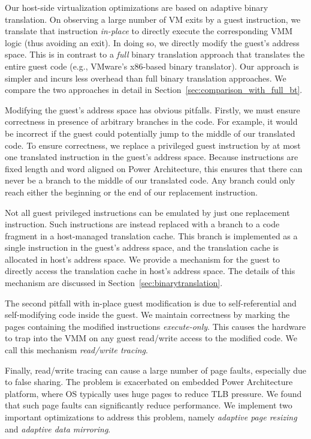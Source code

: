 \documentclass[10pt,twocolumn]{article}
\begin{document}
Our host-side virtualization optimizations are based on adaptive binary
translation. On observing a large number of VM exits by a guest instruction, we translate
that instruction {\em in-place} to directly execute the corresponding
VMM logic (thus avoiding an exit). In doing so, we directly modify the guest's
address space. This is in contrast to a {\em full} binary translation approach
that translates the entire guest code
(e.g., VMware's x86-based binary translator\cite{adams:asplos06}). Our approach is
simpler and incurs less overhead than full binary
translation approaches. We compare the two approaches in detail in
Section~\ref{sec:comparison_with_full_bt}.

Modifying the guest's address space has obvious pitfalls.
Firstly, we must ensure correctness in presence
of arbitrary branches in the code. For example, it would be incorrect if the guest
could potentially jump to the middle of our translated code.
To ensure correctness, we replace a privileged guest instruction
by at most one translated instruction in the guest's address space. Because instructions
are fixed length and word aligned on Power Architecture, this ensures that
there can never be a branch to the middle of our translated
code. Any branch could only reach either the beginning or the end of our
replacement instruction.

Not all guest privileged instructions can be emulated by just one
replacement instruction.
Such instructions are instead replaced with a branch to a code
fragment in a host-managed translation cache. This branch is implemented as a
single instruction in the guest's address space, and the translation
cache is allocated in host's address space. We provide a mechanism for the guest
to directly access the translation cache in host's address space. The
details of this mechanism are discussed in Section~\ref{sec:binarytranslation}.

The second pitfall with in-place guest modification is due to
self-referential and self-modifying code inside the guest. We maintain correctness by 
marking the pages containing the modified instructions {\em execute-only}. This
causes the hardware to trap into the VMM on any guest read/write access to the
modified code. We call this mechanism {\em read/write tracing}.

Finally, read/write tracing can cause a large number of
page faults, especially due to false sharing. The problem is
exacerbated on embedded Power Architecture platform, where OS typically uses
huge pages to reduce TLB pressure. We found that such page faults can
significantly reduce performance.
We implement two important optimizations to address this problem, namely
{\em adaptive page resizing} and {\em adaptive data mirroring}.
\end{document}
